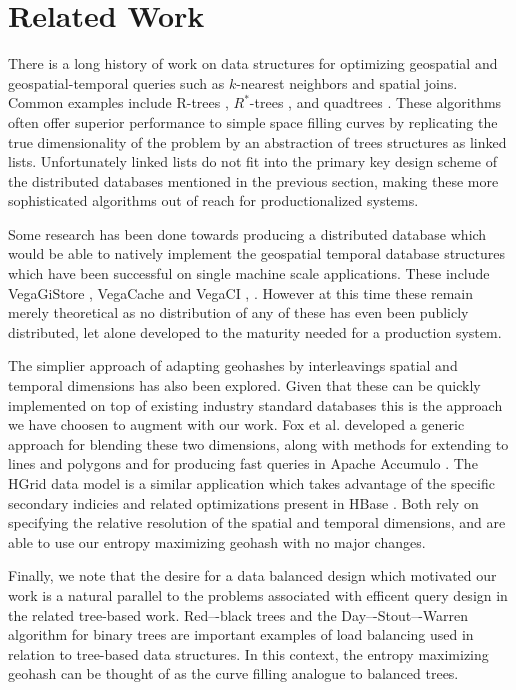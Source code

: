 \documentclass[nips13submit_09,times,art10]{article} %
\begin{document}
\section{Related Work} \label{sec:related}

There is a long history of work on data structures for
optimizing geospatial and geospatial-temporal queries such
as $k$-nearest neighbors and spatial joins. Common examples
include R-trees \cite{guttman1984r},
$R^{*}$-trees \cite{beckmann1990r}, and quadtrees \cite{samet1985storing}.
These algorithms often offer superior performance to simple space filling
curves by replicating the true dimensionality of the problem by an abstraction
of trees structures as linked lists. Unfortunately linked lists do not fit into
the primary key design scheme of the distributed databases mentioned in
the previous section, making these more sophisticated algorithms out of
reach for productionalized systems.

Some research has been done towards producing a distributed database which would
be able to natively implement the geospatial temporal database structures which have been successful
on single machine scale applications. These include VegaGiStore \cite{zhong2012towards},
VegaCache \cite{zhong2013vegacache} and VegaCI \cite{zhong2012distributed}, \cite{zhong2012elastic}.
However at this time these remain merely theoretical as no distribution of any of these
has even been publicly distributed, let alone developed to the maturity needed for a
production system.

The simplier approach of adapting geohashes by interleavings spatial and temporal dimensions
has also been explored. Given that these can be quickly implemented on top of existing industry
standard databases this is the approach we have choosen to augment with our work. Fox et al.
developed a generic approach for blending these two dimensions, along with methods for
extending to lines and polygons and for producing fast queries in Apache Accumulo \cite{fox2013spatio}.
The HGrid data model is a similar application which takes advantage of the specific secondary
indicies and related optimizations present in HBase \cite{han2013hgrid}. Both rely on
specifying the relative resolution of the spatial and temporal dimensions, and are able to
use our entropy maximizing geohash with no major changes.

Finally, we note that the desire for a data balanced design which motivated our work is a
natural parallel to the problems associated with efficent query design in the
related tree-based work. Red–-black trees \cite{bayer1972symmetric} and the
Day–-Stout–-Warren algorithm for binary trees \cite{stout1986tree} are important examples
of load balancing used in relation to tree-based data structures.
In this context, the entropy maximizing geohash can be thought of as the curve filling
analogue to balanced trees.
\end{document}
